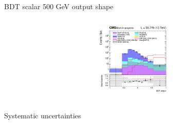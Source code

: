 \documentclass[8pt]{beamer}
\begin{document}
\begin{frame}{BDT scalar 500 GeV output shape}
\begin{columns}
\begin{column}{0.33\textwidth}
\begin{center}
     			\includegraphics[width=1.0\textwidth, height=100pt]{figs/2018/SmearSR-ttDM-scalar500/log_cratio_TTbar_topCR_ll_BDT_ttDM500_TTbar_BDT_output_scalar500_customBinsAttempt7.png}
    		\end{center}		
		\end{column}
\end{columns} \vfill
\end{frame}















\begin{frame}[standout]
Systematic uncertainties
\end{frame}
\end{document}
